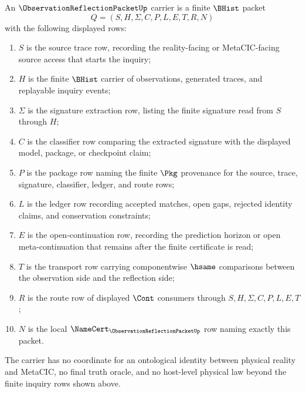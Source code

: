 \begin{definition}
\label{def:observation-reflection-packet-carrier}
An $\ObservationReflectionPacketUp$ carrier is a finite $\BHist$ packet
$$
Q=(S,H,\Sigma,C,P,L,E,T,R,N)
$$
with the following displayed rows:
\begin{enumerate}
\item $S$ is the source trace row, recording the reality-facing or MetaCIC-facing source access that starts the inquiry;
\item $H$ is the finite $\BHist$ carrier of observations, generated traces, and replayable inquiry events;
\item $\Sigma$ is the signature extraction row, listing the finite signature read from $S$ through $H$;
\item $C$ is the classifier row comparing the extracted signature with the displayed model, package, or checkpoint claim;
\item $P$ is the package row naming the finite $\Pkg$ provenance for the source, trace, signature, classifier, ledger, and route rows;
\item $L$ is the ledger row recording accepted matches, open gaps, rejected identity claims, and conservation constraints;
\item $E$ is the open-continuation row, recording the prediction horizon or open meta-continuation that remains after the finite certificate is read;
\item $T$ is the transport row carrying componentwise $\hsame$ comparisons between the observation side and the reflection side;
\item $R$ is the route row of displayed $\Cont$ consumers through $S,H,\Sigma,C,P,L,E,T$;
\item $N$ is the local $\NameCert_{\ObservationReflectionPacketUp}$ row naming exactly this packet.
\end{enumerate}
The carrier has no coordinate for an ontological identity between physical reality and MetaCIC, no final truth oracle, and no host-level physical law beyond the finite inquiry rows shown above.
\end{definition}

